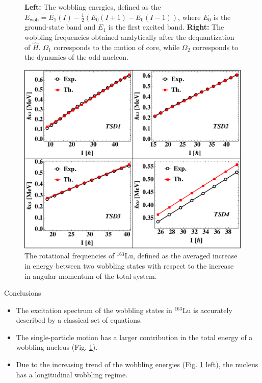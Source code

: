 \documentclass[final]{beamer}
\newlength{\colwidth}
\begin{document}
\begin{frame}[t]
\begin{columns}[t]
\begin{column}{\colwidth}
\begin{figure}
\begin{minipage}{.5\textwidth}
\end{minipage}
\caption{\textbf{Left:} The wobbling energies, defined as the $E_\text{wob}=E_1(I)-\frac{1}{2}(E_0(I+1)-E_0(I-1))$, where $E_0$ is the ground-state band and $E_1$ is the first excited band. \textbf{Right:} The wobbling frequencies obtained analytically after the dequantization of $\hat{H}$. $\Omega_1$ corresponds to the motion of core, while $\Omega_2$ corresponds to the dynamics of the odd-nucleon.}
    \label{wobb-energies}
\end{figure}
\begin{figure}
    \centering
    \includegraphics[scale=1.2]{images/rotFreqs.pdf}
    \caption{The rotational frequencies of $^{163}$Lu, defined as the averaged increase in energy between two wobbling states with respect to the increase in angular momentum of the total system.}
    \label{fig:my_label}
\end{figure}
    \begin{block}{Conclusions}
\begin{itemize}
    \item The excitation spectrum of the wobbling states in $^{163}$Lu is accurately described by a classical set of equations.
    \item The single-particle motion has a larger contribution in the total energy of a wobbling nucleus (Fig. \ref{wobb-energies}).
    \item Due to the increasing trend of the wobbling energies (Fig. \ref{wobb-energies} left), the nucleus has a longitudinal wobbling regime.
\end{itemize}
  \end{block}


\end{column}
\end{columns}
\end{frame}
\end{document}
